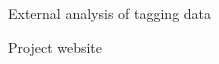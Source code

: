 \documentclass[aspectratio=169,fleqn]{beamer}
\begin{document}

\begin{frame}{External analysis of tagging data}
  
\end{frame}


\begin{frame}{Project website}
  \centering\small
\end{frame}
\end{document}
